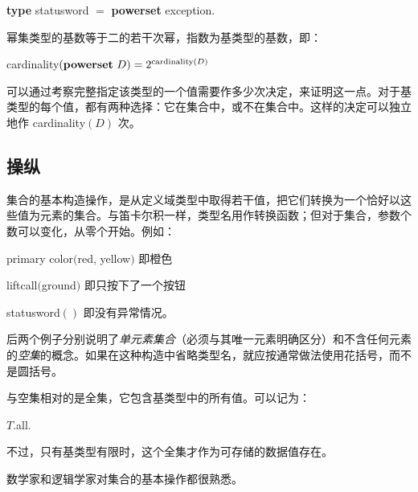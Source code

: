 \documentclass[twoside,11pt,fontset=none]{ctexbook}
\begin{document}
\quad \textbf{type} statusword $=$ \textbf{powerset} exception.

幂集类型的基数等于二的若干次幂，指数为基类型的基数，即：

\quad cardinality$(\text{\textbf{powerset} } D) = 2^{\text{cardinality} (D)}$

可以通过考察完整指定该类型的一个值需要作多少次决定，来证明这一点。对于基类型的每个值，都有两种选择：它在集合中，或不在集合中。这样的决定可以独立地作 cardinality$(D)$ 次。

\subsection{操纵}

集合的基本构造操作，是从定义域类型中取得若干值，把它们转换为一个恰好以这些值为元素的集合。与笛卡尔积一样，类型名用作转换函数；但对于集合，参数个数可以变化，从零个开始。例如：

\quad primary color$($red, yellow$)$ \tabto*{14em} 即橙色

\quad liftcall$($ground$)$ \tabto*{14em} 即只按下了一个按钮

\quad statusword$()$ \tabto*{14em} 即没有异常情况。

\noindent
后两个例子分别说明了\textit{单元素集合}（必须与其唯一元素明确区分）和不含任何元素的\textit{空集}的概念。如果在这种构造中省略类型名，就应按通常做法使用花括号，而不是圆括号。

与空集相对的是全集，它包含基类型中的所有值。可以记为：

\quad $T$.all.

\noindent
不过，只有基类型有限时，这个全集才作为可存储的数据值存在。

数学家和逻辑学家对集合的基本操作都很熟悉。
\end{document}
